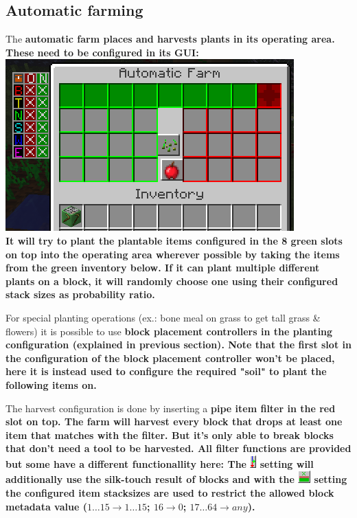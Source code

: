 \documentclass[11pt]{article} %
\begin{document}
\subsection{Automatic farming}
The \bf automatic farm \rm places and harvests plants in its operating area. These need to be configured in its GUI:\\
\includegraphics[width = \textwidth]{farm} \\
It will try to plant the plantable items configured in the 8 green slots on top into the operating area wherever possible by taking the items from the green inventory below. If it can plant multiple different plants on a block, it will randomly choose one using their configured stack sizes as probability ratio. 

For special planting operations (ex.: bone meal on grass to get tall grass \& flowers) it is possible to use \bf block placement controllers \rm in the planting configuration (explained in previous section). Note that the first slot in the configuration of the block placement controller won't be placed, here it is instead used to configure the required "soil" to plant the following items on.

The harvest configuration is done by inserting a \bf pipe item filter \rm in the red slot on top. The farm will harvest every block that drops at least one item that matches with the filter. But it's only able to break blocks that don't need a tool to be harvested. All filter functions are provided but some have a different functionallity here: The \includegraphics[align = c]{sendFurtherN} setting will additionally use the silk-touch result of blocks and with the \includegraphics[align = c]{itemLimitY} setting the configured item stacksizes are used to restrict the allowed block metadata value ($1 \dots 15 \rightarrow 1 \dots 15$; $16 \rightarrow 0$; $17 \dots 64 \rightarrow any$).
\end{document}
